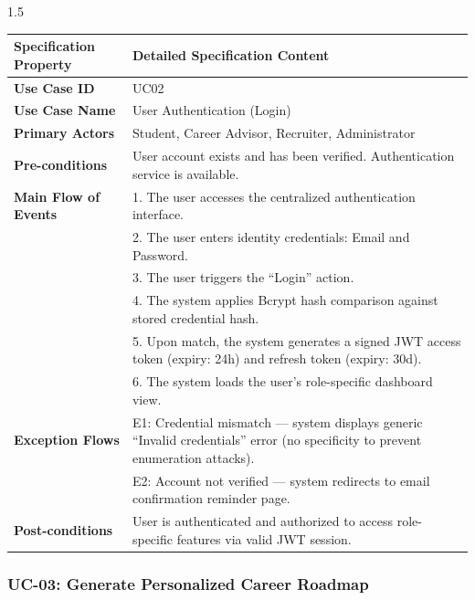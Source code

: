 \documentclass[12pt,a4paper]{report}
\begin{document}
\begin{spacing}{1.5}
		\begin{longtable}{|p{4.5cm}|p{10.5cm}|}
			\hline
			\rowcolor{gray!20}\textbf{Specification Property} & \textbf{Detailed Specification Content} \\ \hline
			\textbf{Use Case ID} & UC02 \\ \hline
			\textbf{Use Case Name} & User Authentication (Login) \\ \hline
			\textbf{Primary Actors} & Student, Career Advisor, Recruiter, Administrator \\ \hline
			\textbf{Pre-conditions} & User account exists and has been verified. Authentication service is available. \\ \hline
			\textbf{Main Flow of Events} &
			1. The user accesses the centralized authentication interface.\\
			& 2. The user enters identity credentials: Email and Password.\\
			& 3. The user triggers the ``Login'' action.\\
			& 4. The system applies Bcrypt hash comparison against stored credential hash.\\
			& 5. Upon match, the system generates a signed JWT access token (expiry: 24h) and refresh token (expiry: 30d).\\
			& 6. The system loads the user's role-specific dashboard view.\\ \hline
			\textbf{Exception Flows} &
			E1: Credential mismatch --- system displays generic ``Invalid credentials'' error (no specificity to prevent enumeration attacks).\\
			& E2: Account not verified --- system redirects to email confirmation reminder page. \\ \hline
			\textbf{Post-conditions} & User is authenticated and authorized to access role-specific features via valid JWT session. \\ \hline
		\end{longtable}
		
		\subsubsection{UC-03: Generate Personalized Career Roadmap}
		

\end{spacing}
\end{document}
